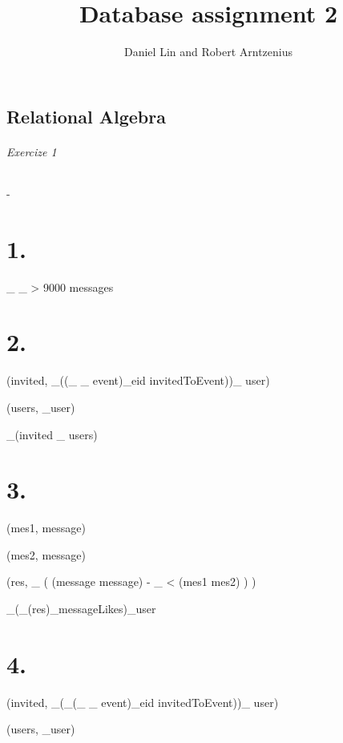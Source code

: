 \documentclass{article}
\title{Database assignment 2}
\author{Daniel Lin and Robert Arntzenius}
\begin{document}
\maketitle

\section{Relational Algebra}

\subparagraph*{Exercize 1}
-

\chapter{1.}


\pi_{}
\sigma_{ \wedge {} > 9000 }messages


\chapter{2.}


\rho(invited, \pi_{}((\pi_{} \sigma_{} event)\bowtie_{{eid}} 
invitedToEvent))\bowtie_{} user)

\rho(users, \pi_{}user)

\pi_{}(invited \bowtie_{} users)

\chapter{3.}

\rho(mes1, message)

\rho(mes2, message)

\rho(res, \pi_{} ( (message \times message) - \sigma_{ < }(mes1 \times mes2) ) )

\pi_{}(\pi_{}(res)\bowtie_{}messageLikes)\bowtie_{}user

\chapter{4.}

\rho(invited, \pi_{}(\sigma_{}(\pi_{} \sigma_{} event)\bowtie_{{eid}} 
invitedToEvent))\bowtie_{} user)

\rho(users, \pi_{}user)
\end{document}
